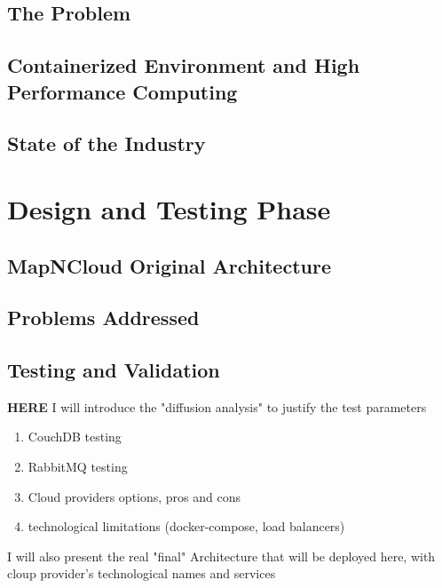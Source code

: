 \documentclass{Configuration_Files/PoliMi3i_thesis}
\begin{document}
    \section{The Problem}
		\label{se:problem}
    
	
		\section{Containerized Environment and High Performance Computing}
		\label{se:containerHPC}
    
		
		\section{State of the Industry}
		\label{se:stateoftheart}
    			
		
	\chapter{Design and Testing Phase}
	\label{ch:designandtesting}

		\section{MapNCloud Original Architecture}
		\label{se:originalarchitecture}
    

		\section{Problems Addressed}
		\label{se:problemsaddressed}
    

		\section{Testing and Validation}
		\label{se:testingvalidation}
			\textbf{HERE} I will introduce the "diffusion analysis" to justify the test parameters
			\begin{enumerate}
				\item CouchDB testing
				\item RabbitMQ testing
				\item Cloud providers options, pros and cons
				\item technological limitations (docker-compose, load balancers)
			\end{enumerate}
			I will also present the real "final" Architecture that will be deployed here, with cloup provider's technological names and services
	
\end{document}
